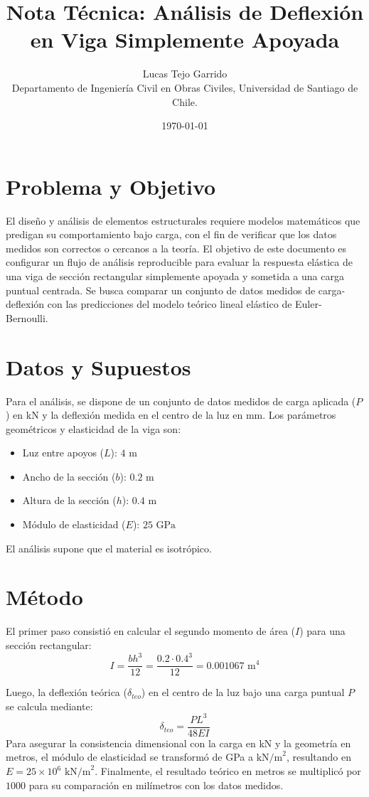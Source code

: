 \documentclass[11pt, a4paper]{article}
\title{\textbf{Nota Técnica: Análisis de Deflexión en Viga Simplemente Apoyada}}
\author{Lucas Tejo Garrido \\\small Departamento de Ingeniería Civil en Obras Civiles, Universidad de Santiago de Chile.}
\date{\today}
\begin{document}
\maketitle

\section{Problema y Objetivo}
El diseño y análisis de elementos estructurales requiere modelos matemáticos que predigan su comportamiento bajo carga, con el fin de verificar que los datos medidos son correctos o cercanos a la teoría. El objetivo de este documento es configurar un flujo de análisis reproducible para evaluar la respuesta elástica de una viga de sección rectangular simplemente apoyada y sometida a una carga puntual centrada. Se busca comparar un conjunto de datos medidos de carga-deflexión con las predicciones del modelo teórico lineal elástico de Euler-Bernoulli.

\section{Datos y Supuestos}
Para el análisis, se dispone de un conjunto de datos medidos de carga aplicada ($P$) en kN y la deflexión medida en el centro de la luz en mm. Los parámetros geométricos y elasticidad de la viga son:
\begin{itemize}
    \item Luz entre apoyos ($L$): $4\text{ m}$
    \item Ancho de la sección ($b$): $0.2\text{ m}$
    \item Altura de la sección ($h$): $0.4\text{ m}$
    \item Módulo de elasticidad ($E$): $25\text{ GPa}$
\end{itemize}
El análisis supone que el material es isotrópico. 

\section{Método}
El primer paso consistió en calcular el segundo momento de área ($I$) para una sección rectangular:
\begin{equation}
    I = \frac{b h^3}{12} = \frac{0.2 \cdot 0.4^3}{12} = 0.001067\text{ m}^4
\end{equation}

Luego, la deflexión teórica ($\delta_{teo}$) en el centro de la luz bajo una carga puntual $P$ se calcula mediante:
\begin{equation}
    \delta_{teo} = \frac{P L^3}{48 E I}
\end{equation}
Para asegurar la consistencia dimensional con la carga en kN y la geometría en metros, el módulo de elasticidad se transformó de GPa a $\text{kN/m}^2$, resultando en $E = 25 \times 10^6 \text{ kN/m}^2$. Finalmente, el resultado teórico en metros se multiplicó por $1000$ para su comparación en milímetros con los datos medidos. 
\end{document}
